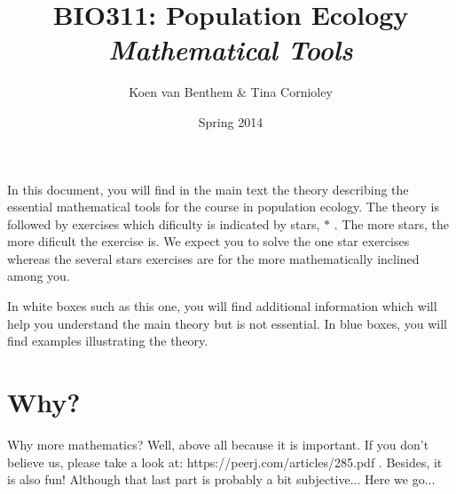 \documentclass[a4paper]{report}
\title{BIO311: Population Ecology\\\textit{Mathematical Tools}}
\author{Koen van Benthem \& Tina Cornioley}
\date{Spring 2014}
\begin{document}

\maketitle
\tableofcontents
\begin{mdframed}
In this document, you will find in the main text the theory describing the essential mathematical tools for the course in population ecology. The theory is followed by exercises which dificulty is indicated by stars, $\ast$ . The more stars, the more dificult the exercise is. We expect you to solve the one star exercises whereas the several stars exercises are for the more mathematically inclined among you.

In white boxes such as this one, you will find additional information which will help you understand the main theory but is not essential. In blue boxes, you will find examples illustrating the theory.
\end{mdframed}
\newpage
\section{Why?}
Why more mathematics? Well, above all because it is important. If you don't believe us, please take a look at: https://peerj.com/articles/285.pdf . Besides, it is also fun! Although that last part is probably a bit subjective... Here we go...
\end{document}
